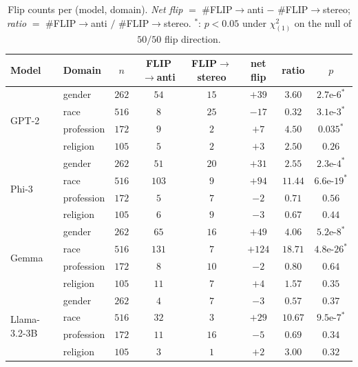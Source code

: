 \begin{table}[h]
\centering
\small
\caption{Flip counts per (model, domain). \emph{Net flip} $=$
\#FLIP$\to$anti $-$ \#FLIP$\to$stereo; \emph{ratio} $=$ \#FLIP$\to$anti
$/$ \#FLIP$\to$stereo. $^*$: $p < 0.05$ under $\chi^2_{(1)}$ on the
null of $50/50$ flip direction.}
\label{tab:flip_ratio}
\begin{tabular}{llcccccc}
\toprule
Model & Domain & $n$ & FLIP$\to$anti & FLIP$\to$stereo & net flip & ratio & $p$ \\
\midrule
\multirow{4}{*}{GPT-2}
& gender     & $262$ & $54$ & $15$ & $+39$ & $3.60$ & $2.7\text{e-}6^*$ \\
& race       & $516$ & $8$  & $25$ & $-17$ & $0.32$ & $3.1\text{e-}3^*$ \\
& profession & $172$ & $9$  & $2$  & $+7$  & $4.50$ & $0.035^*$ \\
& religion   & $105$ & $5$  & $2$  & $+3$  & $2.50$ & $0.26$ \\
\midrule
\multirow{4}{*}{Phi-3}
& gender     & $262$ & $51$  & $20$ & $+31$ & $2.55$ & $2.3\text{e-}4^*$ \\
& race       & $516$ & $103$ & $9$  & $+94$ & $11.44$ & $6.6\text{e-}19^*$ \\
& profession & $172$ & $5$   & $7$  & $-2$  & $0.71$ & $0.56$ \\
& religion   & $105$ & $6$   & $9$  & $-3$  & $0.67$ & $0.44$ \\
\midrule
\multirow{4}{*}{Gemma}
& gender     & $262$ & $65$  & $16$ & $+49$  & $4.06$  & $5.2\text{e-}8^*$ \\
& race       & $516$ & $131$ & $7$  & $+124$ & $18.71$ & $4.8\text{e-}26^*$ \\
& profession & $172$ & $8$   & $10$ & $-2$   & $0.80$  & $0.64$ \\
& religion   & $105$ & $11$  & $7$  & $+4$   & $1.57$  & $0.35$ \\
\midrule
\multirow{4}{*}{Llama-3.2-3B}
& gender     & $262$ & $4$   & $7$  & $-3$  & $0.57$  & $0.37$ \\
& race       & $516$ & $32$  & $3$  & $+29$ & $10.67$ & $9.5\text{e-}7^*$ \\
& profession & $172$ & $11$  & $16$ & $-5$  & $0.69$  & $0.34$ \\
& religion   & $105$ & $3$   & $1$  & $+2$  & $3.00$  & $0.32$ \\
\bottomrule
\end{tabular}
\end{table}

